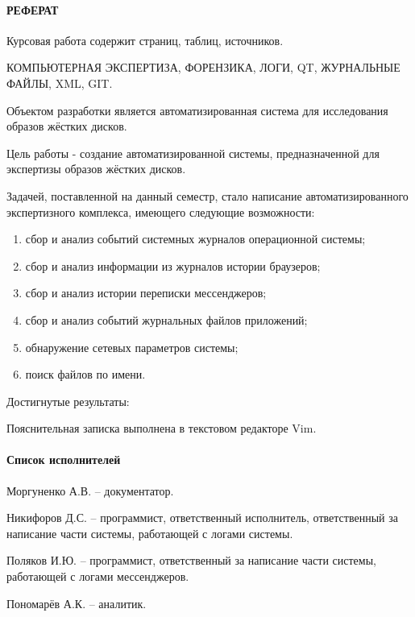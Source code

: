 \documentclass[russian,utf8,14pt,simple]{eskdtext}
\begin{document}
\newpage
{}
\paragraph{\hfill РЕФЕРАТ \hfill}
Курсовая работа содержит  страниц,  таблиц,  источников.

КОМПЬЮТЕРНАЯ ЭКСПЕРТИЗА, ФОРЕНЗИКА, ЛОГИ, QT, ЖУРНАЛЬНЫЕ ФАЙЛЫ, XML, GIT.

Объектом разработки является автоматизированная система для исследования образов жёстких дисков.

Цель работы - создание автоматизированной системы, предназначенной для экспертизы образов жёстких дисков.

Задачей, поставленной на данный семестр, стало написание автоматизированного экспертизного комплекса, имеющего следующие возможности: 

\begin{enumerate}
\item сбор и анализ событий системных журналов операционной системы;
\item сбор и анализ информации из журналов истории браузеров;
\item сбор и анализ истории переписки мессенджеров;
\item сбор и анализ событий журнальных файлов приложений;
\item обнаружение сетевых параметров системы;
\item поиск файлов по имени.
\end{enumerate}

Достигнутые результаты:%

Пояснительная записка выполнена в текстовом редакторе Vim.

\newpage
{}
\paragraph{\hfill Список исполнителей \hfill}
Моргуненко А.В. -- документатор.

Никифоров Д.С. -- программист, ответственный исполнитель, ответственный за написание части системы, работающей с логами системы.

Поляков И.Ю. -- программист, ответственный за написание части системы, работающей с логами мессенджеров.

Пономарёв А.К. -- аналитик.
\end{document}
